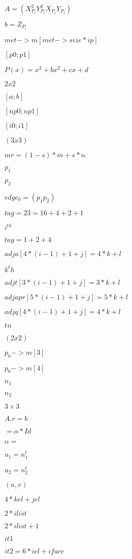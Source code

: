 \documentclass{article}
\begin{document}
$ A=( X_{P_i}^2 Y_{P_i}^2 X_{P_i}Y_{P_i}) $
\pagebreak

$ b= Z_{P_i}$
\pagebreak

$ met->m[met->size * ip] $
\pagebreak

$[p0;p1]$
\pagebreak

$P(x) = x^3+bx^2+cx+d$
\pagebreak

$2x2$
\pagebreak

$[a;b]$
\pagebreak

$[np0;np1]$
\pagebreak

$[i0;i1]$
\pagebreak

$(3 x 3)$
\pagebreak

$ mr = (1-s)*m +s*n $
\pagebreak

$p_1$
\pagebreak

$p_2$
\pagebreak

$edge_0 = (p_1p_2)$
\pagebreak

$tag=23=16+4+2+1$
\pagebreak

$i^{th}$
\pagebreak

$tag = 1+2+4$
\pagebreak

$adja[4*(i-1)+1+j]=4*k+l$
\pagebreak

$k^th$
\pagebreak

$adjt[3*(i-1)+1+j]=3*k+l$
\pagebreak

$adjapr[5*(i-1)+1+j]=5*k+l$
\pagebreak

$adjq[4*(i-1)+1+j]=4*k+l$
\pagebreak

$t^{}n$
\pagebreak

$(2x2)$
\pagebreak

$ p_0->m[3]$
\pagebreak

$ p_0->m[4]$
\pagebreak

$n_1$
\pagebreak

$n_2$
\pagebreak

$ 3\times 3$
\pagebreak

$ A . r = b $
\pagebreak

$=\alpha*Id$
\pagebreak

$\alpha =$
\pagebreak

$ u_1 = n_1^t$
\pagebreak

$ u_2 = n_2^t$
\pagebreak

$(u,v)$
\pagebreak

$4*kel + jel$
\pagebreak

$2*ilist$
\pagebreak

$2*ilist+1$
\pagebreak

$ it1 $
\pagebreak

$ it2 = 6*iel + iface$
\pagebreak
\end{document}
